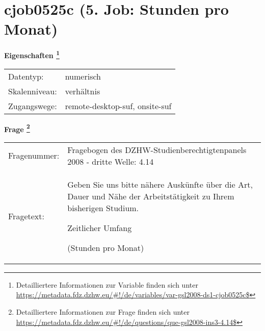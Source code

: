 
    \setcounter{footnote}{0}

    \vspace*{-1.8cm}
	\section{cjob0525c (5. Job: Stunden pro Monat)}
	\label{section:cjob0525c}



    \vspace*{0.5cm}
    \noindent\textbf{Eigenschaften
	\footnote{Detailliertere Informationen zur Variable finden sich unter
		\url{https://metadata.fdz.dzhw.eu/\#!/de/variables/var-gsl2008-ds1-cjob0525c$}}}\\
	\begin{tabularx}{\hsize}{@{}lX}
	Datentyp: & numerisch \\
	Skalenniveau: & verhältnis \\
	Zugangswege: &
	  remote-desktop-suf, 
	  onsite-suf
 \\
    \end{tabularx}



				\vspace*{0.5cm}
                \noindent\textbf{Frage
	                \footnote{Detailliertere Informationen zur Frage finden sich unter
		              \url{https://metadata.fdz.dzhw.eu/\#!/de/questions/que-gsl2008-ins3-4.14$}}}\\
				\begin{tabularx}{\hsize}{@{}lX}
					Fragenummer: &
					  Fragebogen des DZHW-Studienberechtigtenpanels 2008 - dritte Welle:
					  4.14
 \\
					Fragetext: & Geben Sie uns bitte nähere Auskünfte über die Art, Dauer und Nähe der Arbeitstätigkeit zu Ihrem bisherigen Studium.\par  Zeitlicher Umfang\par  (Stunden pro Monat) \\
				\end{tabularx}






